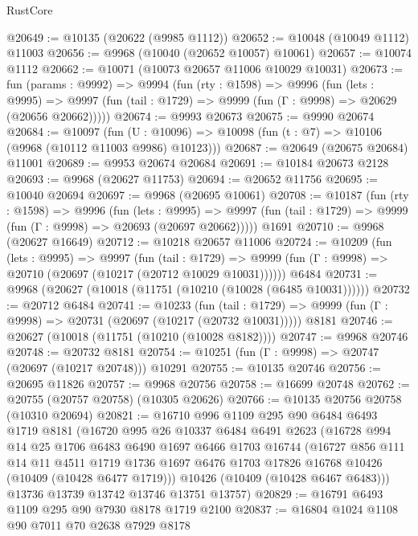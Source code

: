 \begin{lexlean}{RustCore}
\begin{coremodule}
@20649 := @10135 (@20622 (@9985 @1112))
@20652 := @10048 (@10049 @1112) @11003
@20656 := @9968 (@10040 (@20652 @10057) @10061)
@20657 := @10074 @1112
@20662 := @10071 (@10073 @20657 @11006 @10029 @10031)
@20673 := fun (params : @9992) =>
  @9994
    (fun (rty : @1598) =>
    @9996
      (fun (lets : @9995) =>
      @9997 (fun (tail : @1729) => @9999 (fun (Γ : @9998) => @20629 (@20656 @20662)))))
@20674 := @9993 @20673
@20675 := @9990 @20674
@20684 := @10097
    (fun (U : @10096) => @10098 (fun (t : @7) => @10106 (@9968 (@10112 @11003 @9986) @10123)))
@20687 := @20649 (@20675 @20684) @11001
@20689 := @9953 @20674 @20684
@20691 := @10184 @20673 @2128
@20693 := @9968 (@20627 @11753)
@20694 := @20652 @11756
@20695 := @10040 @20694
@20697 := @9968 (@20695 @10061)
@20708 := @10187
    (fun (rty : @1598) =>
    @9996
      (fun (lets : @9995) =>
      @9997 (fun (tail : @1729) => @9999 (fun (Γ : @9998) => @20693 (@20697 @20662)))))
    @1691
@20710 := @9968 (@20627 @16649)
@20712 := @10218 @20657 @11006
@20724 := @10209
    (fun (lets : @9995) =>
    @9997
      (fun (tail : @1729) =>
      @9999 (fun (Γ : @9998) => @20710 (@20697 (@10217 (@20712 @10029 @10031))))))
    @6484
@20731 := @9968 (@20627 (@10018 (@11751 (@10210 (@10028 (@6485 @10031))))))
@20732 := @20712 @6484
@20741 := @10233
    (fun (tail : @1729) => @9999 (fun (Γ : @9998) => @20731 (@20697 (@10217 (@20732 @10031)))))
    @8181
@20746 := @20627 (@10018 (@11751 (@10210 (@10028 @8182))))
@20747 := @9968 @20746
@20748 := @20732 @8181
@20754 := @10251 (fun (Γ : @9998) => @20747 (@20697 (@10217 @20748))) @10291
@20755 := @10135 @20746
@20756 := @20695 @11826
@20757 := @9968 @20756
@20758 := @16699 @20748
@20762 := @20755 (@20757 @20758) (@10305 @20626)
@20766 := @10135 @20756 @20758 (@10310 @20694)
@20821 := @16710
    @996
    @1109
    @295
    @90
    @6484
    @6493
    @1719
    @8181
    (@16720
      @995
      @26
      @10337
      @6484
      @6491
      @2623
      (@16728
        @994
        @14
        @25
        @1706
        @6483
        @6490
        @1697
        @6466
        @1703
        @16744
        (@16727
          @856
          @111
          @14
          @11
          @4511
          @1719
          @1736
          @1697
          @6476
          @1703
          @17826
          @16768
          @10426
          (@10409 (@10428 @6477 @1719)))
        @10426
        (@10409 (@10428 @6467 @6483)))
      @13736
      @13739
      @13742
      @13746
      @13751
      @13757)
@20829 := @16791 @6493 @1109 @295 @90 @7930 @8178 @1719 @2100
@20837 := @16804 @1024 @1108 @90 @7011 @70 @2638 @7929 @8178

\end{coremodule}
\end{lexlean}
